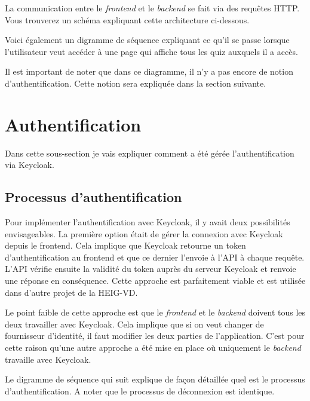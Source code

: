 La communication entre le \emph{frontend} et le \emph{backend} se fait via des requêtes HTTP. Vous trouverez un schéma expliquant cette architecture  ci-dessous.


Voici également un digramme de séquence expliquant ce qu'il se passe lorsque l'utilisateur veut accéder à une page qui affiche tous les quiz auxquels il a accès.


Il est important de noter que dans ce diagramme, il n'y a pas encore de notion d'authentification. Cette notion sera expliquée dans la section suivante.

\section{Authentification}
Dans cette sous-section je vais expliquer comment a été gérée l'authentification via Keycloak.

\subsection{Processus d'authentification}
Pour implémenter l'authentification avec Keycloak, il y avait deux possibilités envisageables. La première option était de gérer la connexion avec Keycloak depuis le frontend. Cela implique que Keycloak retourne un token d'authentification au frontend et que ce dernier l'envoie à l'API à chaque requête. L'API vérifie ensuite la validité du token auprès du serveur Keycloak et renvoie une réponse en conséquence. Cette approche est parfaitement viable et est utilisée dans d'autre projet de la HEIG-VD.

Le point faible de cette approche est que le \emph{frontend} et le \emph{backend} doivent tous les deux travailler avec Keycloak. Cela implique que si on veut changer de fournisseur d'identité, il faut modifier les deux parties de l'application.
C'est pour cette raison qu'une autre approche a été mise en place où uniquement le \emph{backend} travaille avec Keycloak.

Le digramme de séquence qui suit explique de façon détaillée quel est le processus d'authentification. A noter que le processus de déconnexion est identique.

